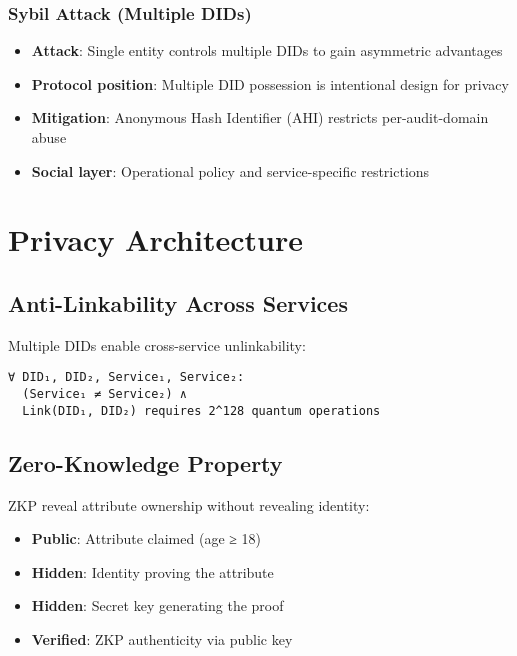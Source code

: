 \subsection{Sybil Attack (Multiple DIDs)}

\begin{itemize}
  \item \textbf{Attack}: Single entity controls multiple DIDs to gain asymmetric advantages
  \item \textbf{Protocol position}: Multiple DID possession is intentional design for privacy
  \item \textbf{Mitigation}: Anonymous Hash Identifier (AHI) restricts per-audit-domain abuse
  \item \textbf{Social layer}: Operational policy and service-specific restrictions
\end{itemize}

\chapter{Privacy Architecture}

\section{Anti-Linkability Across Services}

Multiple DIDs enable cross-service unlinkability:

\begin{verbatim}
∀ DID₁, DID₂, Service₁, Service₂:
  (Service₁ ≠ Service₂) ∧
  Link(DID₁, DID₂) requires 2^128 quantum operations
\end{verbatim}

\section{Zero-Knowledge Property}

ZKP reveal attribute ownership without revealing identity:

\begin{itemize}
  \item \textbf{Public}: Attribute claimed (age ≥ 18)
  \item \textbf{Hidden}: Identity proving the attribute
  \item \textbf{Hidden}: Secret key generating the proof
  \item \textbf{Verified}: ZKP authenticity via public key
\end{itemize}

